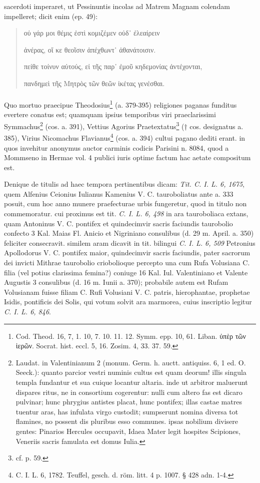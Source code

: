 \documentclass[a4paper, 11pt, oneside, polutonikogreek, german, twocolumn]{article}
\begin{document}
sacerdoti imperaret, ut Pessinuntis incolas ad Matrem Magnam colendam impelleret; dicit enim (ep. 49):
\begin{quotation}
\hspace*{5mm}οὐ γάρ μοι θέμις ἐστὶ κομιζέμεν οὐδ᾽ ἐλεαίρειν

\hspace*{5mm}ἀνέρας, οἵ κε θεοῖσιν ἀπέχθωντ᾽ ἀθανάτοισιν.

πείθε τοίνυν αὐτούς, εἰ τῆς παρ᾽ ἐμοῦ κηδεμονίας ἀντέχονται,

πανδημεὶ τῆς Μητρὸς τῶν θεῶν ἱκέτας γενέσθαι.
\end{quotation}
\paragraph{}
Quo mortuo praecipue Theodosius\footnote{Cod. Theod. 16, 7, 1. 10, 7. 10. 11. 12. Symm. epp. 10, 61. Liban. ὑπὲρ τῶν ἱερῶν. Socrat. hist. eccl. 5, 16. Zosim. 4, 33. 37. 59.} (a. 379-395) religiones paganas funditus evertere conatus est; quamquam ipsius temporibus viri praeclarissimi Symmachus\footnote{Laudat. in Valentinianum 2 (monum. Germ. h. auctt. antiquiss. 6, 1 ed. O. Seeck.): quanto parcior vestri numinis cultus est quam deorum! illis singula templa fundantur et sua cuique locantur altaria. inde ut arbitror maluerunt dispares ritus, ne in consortium cogerentur: nulli cum altero fas est dicaro pulvinar; hunc phrygius antistes placat, hunc pontifex; illas castae matres tuentur aras, has infulata virgo custodit; sumpserunt nomina diversa tot flamines, no possent dis pluribus esso communes. ipsas nobilium divisere gentes: Pinarios Hercules occupavit, Idaea Mater legit hospites Scipiones, Veneriis sacris famulata est domus Iulia.} (cos. a. 391), Vettius Agorius Praetextatus\footnote{cf. p. 59.} († cos. designatus a. 385), Virius Nicomachus Flavianus\footnote{C. I. L. 6, 1782. Teuffel, gesch. d. röm. litt. 4 p. 1007. § 428 adn. 1-4.} (cos. a. 394) cultui pagano dediti erant. in quos invehitur anonymus auctor carminis codicis Parisini n. 8084, quod a Mommseno in Hermae vol. 4 publici iuris optime factum hac aetate compositum est.

Denique de titulis ad haec tempora pertinentibus dicam: \emph{Tit. C. I. L. 6, 1675}, quem Alfenius Ceionius Iulianus Kamenius V. C. tauroboliatus ante a. 333 posuit, cum hoc anno munere praefecturae urbis fungeretur, quod in titulo non commemoratur. cui proximus est tit. \emph{C. I. L. 6, 498} in ara tauroboliaca extans, quam Antoninus V. C. pontifex et quindecimvir sacris faciundis taurobolio confecto 3 Kal. Maias Fl. Anicio et Nigriniano consulibus (d. 29 m. April. a. 350) feliciter consecravit. similem aram dicavit in tit. bilingui \emph{C. I. L. 6, 509} Petronius Apollodorus V. C. pontifex maior, quindecimvir sacris faciundis, pater sacrorum dei invicti Mithrae taurobolio criobolioque percepto una cum Rufa Volusiana C. filia (vel potius clarissima femina?) coniuge 16 Kal. Iul. Valentiniano et Valente Augustis 3 consulibus (d. 16 m. Iunii a. 370); probabile autem est Rufam Volusianam fuisse filiam C. Rufi Volusiani V. C. patris, hierophantae, prophetae Isidis, pontificis dei Solis, qui votum solvit ara marmorea, cuius inscriptio legitur \emph{C. I. L. 6, 846}.
\end{document}
